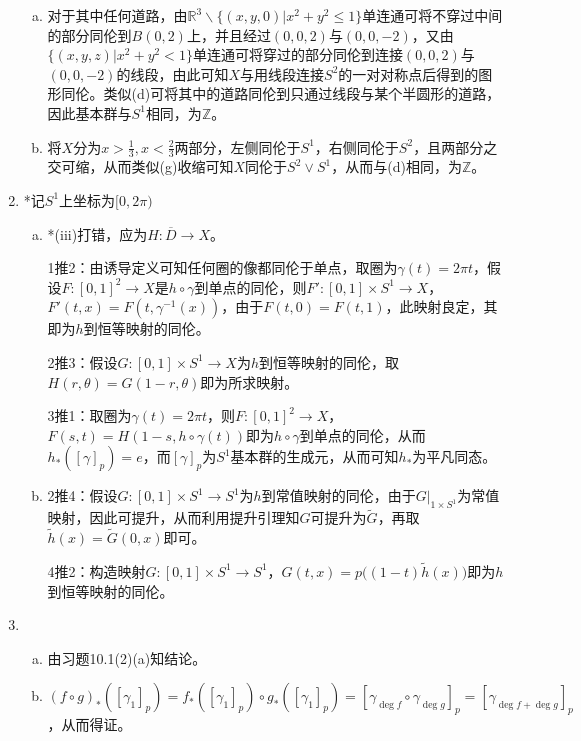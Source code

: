 \documentclass[a4paper,UTF8,fontset=windows]{ctexart}
\begin{document}
\begin{enumerate}[(1)]
\begin{enumerate}[(a)]
    \item
    对于其中任何道路，由$\mathbb{R}^3\backslash\{(x,y,0)|x^2+y^2\le1\}$单连通可将不穿过中间的部分同伦到$B(0,2)$上，并且经过$(0,0,2)$与$(0,0,-2)$，又由$\{(x,y,z)|x^2+y^2<1\}$单连通可将穿过的部分同伦到连接$(0,0,2)$与$(0,0,-2)$的线段，由此可知$X$与用线段连接$S^2$的一对对称点后得到的图形同伦。类似(d)可将其中的道路同伦到只通过线段与某个半圆形的道路，因此基本群与$S^1$相同，为$\mathbb{Z}$。
    
    \item
    将$X$分为$x>\frac{1}{3},x<\frac{2}{3}$两部分，左侧同伦于$S^1$，右侧同伦于$S^2$，且两部分之交可缩，从而类似(g)收缩可知$X$同伦于$S^2\vee S^1$，从而与(d)相同，为$\mathbb{Z}$。
    \end{enumerate}
    
    \item
    *记$S^1$上坐标为$[0,2\pi)$
    
    \begin{enumerate}[(a)]
    \item
    *(iii)打错，应为$H:\overline{D}\to X$。
    
    1推2：由诱导定义可知任何圈的像都同伦于单点，取圈为$\gamma(t)=2\pi t$，假设$F:[0,1]^2\to X$是$h\circ\gamma$到单点的同伦，则$F':[0,1]\times S^1\to X$，$F'(t,x)=F(t,\gamma^{-1}(x))$，由于$F(t,0)=F(t,1)$，此映射良定，其即为$h$到恒等映射的同伦。
    
    2推3：假设$G:[0,1]\times S^1\to X$为$h$到恒等映射的同伦，取$H(r,\theta)=G(1-r,\theta)$即为所求映射。
    
    3推1：取圈为$\gamma(t)=2\pi t$，则$F:[0,1]^2\to X$，$F(s,t)=H(1-s,h\circ\gamma(t))$即为$h\circ\gamma$到单点的同伦，从而$h_*([\gamma]_p)=e$，而$[\gamma]_p$为$S^1$基本群的生成元，从而可知$h_*$为平凡同态。
    
    \item
    2推4：假设$G:[0,1]\times S^1\to S^1$为$h$到常值映射的同伦，由于$G|_{1\times S^1}$为常值映射，因此可提升，从而利用提升引理知$G$可提升为$\tilde{G}$，再取$\tilde{h}(x)=\tilde{G}(0,x)$即可。
    
    4推2：构造映射$G:[0,1]\times S^1\to S^1$，$G(t,x)=p\big((1-t)\tilde{h}(x)\big)$即为$h$到恒等映射的同伦。
    \end{enumerate}
    
    \item
    \begin{enumerate}[(a)]
    \item
    由习题10.1(2)(a)知结论。
    
    \item
    $(f\circ g)_*([\gamma_1]_p)=f_*([\gamma_1]_p)\circ g_*([\gamma_1]_p)=[\gamma_{\deg f}\circ\gamma_{\deg g}]_p=[\gamma_{\deg f+\deg g}]_p$，从而得证。
    

\end{enumerate}
\end{enumerate}
\end{document}
